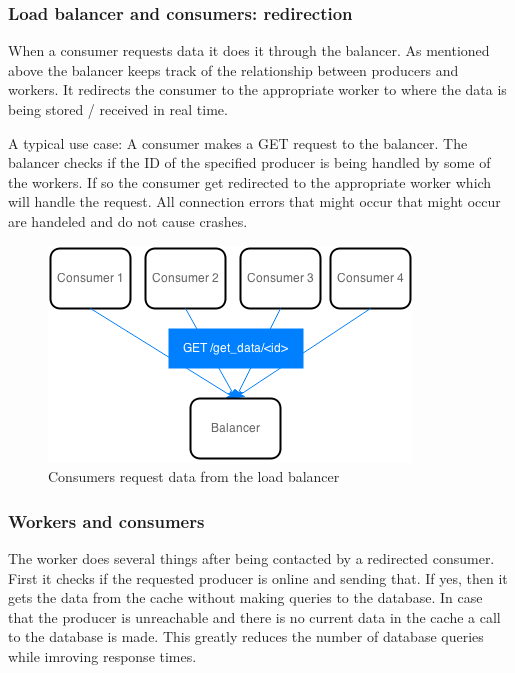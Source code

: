 \documentclass{sigchi}
\begin{document}
\subsubsection{Load balancer and consumers: redirection}

When a consumer requests data it does it through the balancer. As mentioned above the balancer keeps track of the relationship between producers and workers. It redirects the consumer to the appropriate worker to where the data is being stored / received in real time.

A typical use case:
A consumer makes a GET request to the balancer. The balancer checks if the ID of the specified producer is being handled by some of the workers. If so the consumer get redirected to the appropriate worker which will handle the request. All connection errors that might occur that might occur are handeled and do not cause crashes.

\begin{figure}[!h]
\centering
\includegraphics[width=0.9\columnwidth]{img/consumer_req}
\caption{Consumers request data from the load balancer}
\label{fig:consumer_req}
\end{figure}

\subsubsection{Workers and consumers}

The worker does several things after being contacted by a redirected consumer. First it checks if the requested producer is online and sending that. If yes, then it gets the data from the cache without making queries to the database. In case that the producer is unreachable and there is no current data in the cache a call to the database is made. This greatly reduces the number of database queries while imroving response times.
\end{document}
